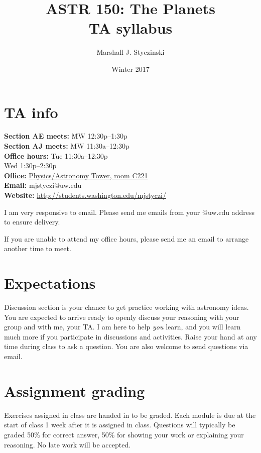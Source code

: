 \documentclass[12pt,letterpaper]{article}
\title{ASTR 150: The Planets\\ \vspace{0.25cm} \large{TA syllabus}}
\author{Marshall J. Styczinski}
\date{Winter 2017}
\begin{document}
\maketitle
\onehalfspacing
\thispagestyle{empty}

\section{TA info}
	\begin{tabbing}
		\textbf{Section AE meets:}		\= MW 12:30p--1:30p\\
		\textbf{Section AJ meets:}	\> MW 11:30a--12:30p\\[\baselineskip]
		\textbf{Office hours:}	\> Tue 11:30a--12:30p\\
			\> Wed 1:30p--2:30p\\
		\textbf{Office:}\> \href{http://students.washington.edu/mjstyczi/images/PAT_map.png}{Physics/Astronomy Tower, room C221}\\	
		\textbf{Email:}\> mjstyczi@uw.edu\\
		\textbf{Website:}\> \url{http://students.washington.edu/mjstyczi/}

	\end{tabbing}

	I am very responsive to email. Please send me emails from your @uw.edu address to ensure delivery.
	
	If you are unable to attend my office hours, please send me an email to arrange another time to meet.
	

\section{Expectations}
	Discussion section is your chance to get practice working with astronomy ideas. You are expected to arrive ready to openly discuss your reasoning with your group and with me, your TA. I am here to help \textit{you} learn, and you will learn much more if you participate in discussions and activities. Raise your hand at any time during class to ask a question. You are also welcome to send questions via email.
	
\section{Assignment grading}
	Exercises assigned in class are handed in to be graded. Each module is due at the start of class 1 week after it is assigned in class. Questions will typically be graded 50\% for correct answer, 50\% for showing your work or explaining your reasoning. No late work will be accepted.
\end{document}
